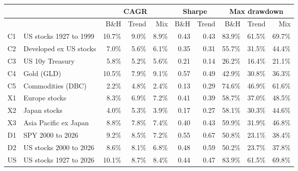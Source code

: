 \begin{tabular}{llrrrrrrrr}
\toprule
 &  & \multicolumn{3}{c}{CAGR} & \multicolumn{2}{c}{Sharpe} & \multicolumn{3}{c}{Max drawdown} \\
\midrule
 &  & B\&H & Trend & Mix & B\&H & Trend & B\&H & Trend & Mix \\
\midrule
C1 & US stocks 1927 to 1999 & 10.7\% & 9.0\% & 8.9\% & 0.43 & 0.43 & 83.9\% & 61.5\% & 69.7\% \\
C2 & Developed ex US stocks & 7.0\% & 5.6\% & 6.1\% & 0.35 & 0.31 & 55.7\% & 31.5\% & 44.4\% \\
\midrule
C3 & US 10y Treasury & 5.8\% & 5.2\% & 5.6\% & 0.21 & 0.14 & 26.2\% & 16.4\% & 21.1\% \\
C4 & Gold (GLD) & 10.5\% & 7.9\% & 9.1\% & 0.57 & 0.49 & 42.9\% & 30.8\% & 36.3\% \\
C5 & Commodities (DBC) & 2.2\% & 4.8\% & 2.4\% & 0.13 & 0.29 & 74.6\% & 46.9\% & 61.6\% \\
\midrule
X1 & Europe stocks & 8.3\% & 6.9\% & 7.2\% & 0.41 & 0.39 & 58.7\% & 37.0\% & 48.5\% \\
X2 & Japan stocks & 4.0\% & 5.3\% & 3.9\% & 0.17 & 0.27 & 58.1\% & 30.3\% & 44.6\% \\
X3 & Asia Pacific ex Japan & 8.8\% & 7.8\% & 7.4\% & 0.40 & 0.43 & 59.9\% & 31.9\% & 46.8\% \\
\midrule
D1 & SPY 2000 to 2026 & 9.2\% & 8.5\% & 7.2\% & 0.55 & 0.67 & 50.8\% & 23.1\% & 38.4\% \\
D2 & US stocks 2000 to 2026 & 8.6\% & 8.1\% & 6.8\% & 0.48 & 0.59 & 50.2\% & 23.7\% & 37.8\% \\
US & US stocks 1927 to 2026 & 10.1\% & 8.7\% & 8.4\% & 0.44 & 0.47 & 83.9\% & 61.5\% & 69.8\% \\
\bottomrule
\end{tabular}
